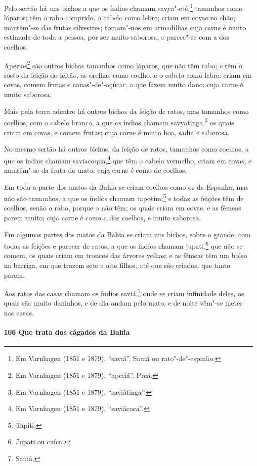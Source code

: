 Pelo sertão há uns bichos a que os índios chamam savya"-eté,\footnote{ Em Varnhagen (1851 e
1879), ``saviá''. Sauiá ou rato"-de"-espinho.} tamanhos como láparos; têm o rabo comprido,
o cabelo como lebre; criam em covas no chão; mantêm"-se das frutas silvestres; tomam"-nos em
armadilhas cuja carne é muito estimada de toda a pessoa, por ser muito saborosa, e
parece"-se com a dos coelhos.

Aperias\footnote{ Em Varnhagen (1851 e 1879), ``aperiá''. Preá.} são outros bichos
tamanhos como láparos, que não têm rabo; e têm o rosto da feição do leitão, as orelhas
como coelho, e o cabelo como lebre; criam em covas, comem frutas e canas"-de"-açúcar, a que
fazem muito dano; cuja carne é muito saborosa.

Mais pela terra adentro há outros bichos da feição de ratos, mas tamanhos como coelhos,
com o cabelo branco, a que os índios chamam savyatinga,\footnote{ Em Varnhagen (1851 e
1879), ``saviátinga''.} os quais criam em covas, e comem frutas; cuja carne é muito boa,
sadia e saborosa.

No mesmo sertão há outros bichos, da feição de ratos, tamanhos como coelhos, a que os
índios chamam saviacoqua,\footnote{ Em Varnhagen (1851 e 1879), ``saviácoca''.} que têm o
cabelo vermelho, criam em covas, e mantêm"-se da fruta do mato; cuja carne é como de
coelhos.

Em toda a parte dos matos da Bahia se criam coelhos como os da Espanha, mas não são
tamanhos, a que os índios chamam tapotim;\footnote{ Tapiti.} e todas as feições têm de
coelhos, senão o rabo, porque o não têm; os quais criam em covas, e as fêmeas parem muito;
cuja carne é como a dos coelhos, e muito saborosa.

Em algumas partes dos matos da Bahia se criam uns bichos, sobre o grande, com todas as
feições e parecer de ratos, a que os índios chamam jupati,\footnote{ Jupati ou cuíca.} que
não se comem, os quais criam em troncos das árvores velhas; e as fêmeas têm um bolso na
barriga, em que trazem sete e oito filhos, até que são criados, que tanto parem.

Aos ratos das casas chamam os índios saviá,\footnote{ Sauiá.} onde se criam infinidade
deles, os quais são muito daninhos, e de dia andam pelo mato, e de noite vêm"-se meter nas
casas.

\paragraph{106 Que trata dos cágados da Bahia}

